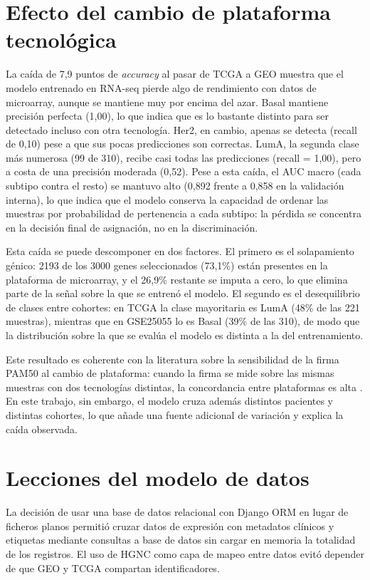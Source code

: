 \documentclass[12pt, a4paper]{report}
\begin{document}
\section{Efecto del cambio de plataforma tecnológica}

La caída de 7,9 puntos de \textit{accuracy} al pasar de TCGA a GEO muestra que el modelo entrenado en RNA-seq pierde algo de rendimiento con datos de microarray, aunque se mantiene muy por encima del azar. Basal mantiene precisión perfecta (1,00), lo que indica que es lo bastante distinto para ser detectado incluso con otra tecnología. Her2, en cambio, apenas se detecta (recall de 0,10) pese a que sus pocas predicciones son correctas. LumA, la segunda clase más numerosa (99 de 310), recibe casi todas las predicciones (recall = 1,00), pero a costa de una precisión moderada (0,52). Pese a esta caída, el AUC macro (cada subtipo contra el resto) se mantuvo alto (0,892 frente a 0,858 en la validación interna), lo que indica que el modelo conserva la capacidad de ordenar las muestras por probabilidad de pertenencia a cada subtipo: la pérdida se concentra en la decisión final de asignación, no en la discriminación.

Esta caída se puede descomponer en dos factores. El primero es el solapamiento génico: 2193 de los 3000 genes seleccionados (73,1\%) están presentes en la plataforma de microarray, y el 26,9\% restante se imputa a cero, lo que elimina parte de la señal sobre la que se entrenó el modelo. El segundo es el desequilibrio de clases entre cohortes: en TCGA la clase mayoritaria es LumA (48\% de las 221 muestras), mientras que en GSE25055 lo es Basal (39\% de las 310), de modo que la distribución sobre la que se evalúa el modelo es distinta a la del entrenamiento.

Este resultado es coherente con la literatura sobre la sensibilidad de la firma PAM50 al cambio de plataforma: cuando la firma se mide sobre las mismas muestras con dos tecnologías distintas, la concordancia entre plataformas es alta \cite{picornell_breast_2019}. En este trabajo, sin embargo, el modelo cruza además distintos pacientes y distintas cohortes, lo que añade una fuente adicional de variación y explica la caída observada.

\section{Lecciones del modelo de datos}

La decisión de usar una base de datos relacional con Django ORM en lugar de ficheros planos permitió cruzar datos de expresión con metadatos clínicos y etiquetas mediante consultas a base de datos sin cargar en memoria la totalidad de los registros. El uso de HGNC como capa de mapeo entre datos evitó depender de que GEO y TCGA compartan identificadores.
\end{document}
